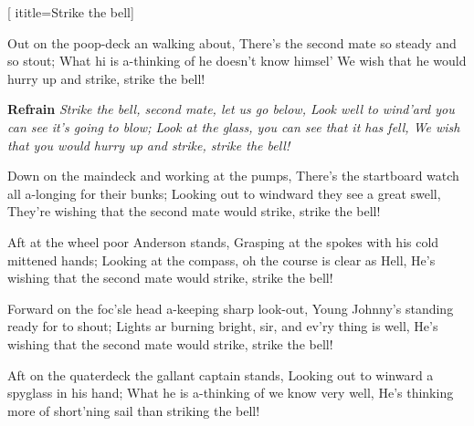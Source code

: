 [
ititle={Strike the bell}]


\beginverse
Out on the poop-deck an walking about,
There's the second mate so steady and so stout;
What hi is a-thinking of he doesn't know himsel'
We wish that he would hurry up and strike, strike the bell!
\endverse

\beginchorus
\textbf{Refrain}
\textit{Strike the bell, second mate, let us go below,
	Look well to wind'ard you can see it's going to blow;
	Look at the glass, you can see that it has fell,
	We wish that you would hurry up and strike, strike the bell!}
\endchorus

\beginverse
Down on the maindeck and working at the pumps,
There's the startboard watch all a-longing for their bunks;
Looking out to windward they see a great swell,
They're wishing that the second mate would strike, strike the bell!
\endverse

\beginverse
Aft at the wheel poor Anderson stands,
Grasping at the spokes with his cold mittened hands;
Looking at the compass, oh the course is clear as Hell,
He's wishing that the second mate would strike, strike the bell!
\endverse

\beginverse
Forward on the foc'sle head a-keeping sharp look-out,
Young Johnny's standing ready for to shout;
Lights ar burning bright, sir, and ev'ry thing is well,
He's wishing that the second mate would strike, strike the bell!
\endverse

\beginverse
Aft on the quaterdeck the gallant captain stands,
Looking out to winward a spyglass in his hand;
What he is a-thinking of we know very well,
He's thinking more of short'ning sail than striking the bell!
\endverse
\endsong